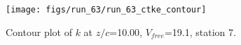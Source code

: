 \begin{figure}[H]
\centering
\texttt{[image: figs/run\_63/run\_63\_ctke\_contour]}
\caption{Contour plot of $k$ at $z/c$=10.00, $V_{free}$=19.1, station 7.}
\end{figure}


